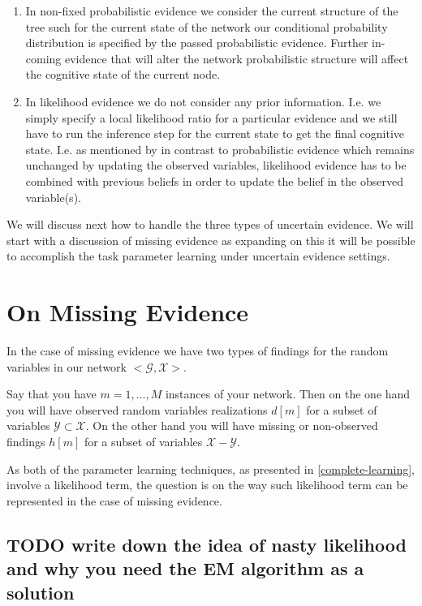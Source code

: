 \documentclass[11pt]{article}
\begin{document}
\begin{article}
\begin{enumerate}
\item In non-fixed probabilistic evidence we consider the current
structure of the tree such for the current state of the network
our conditional probability distribution is specified by the
passed probabilistic evidence. Further in-coming evidence that
will alter the network probabilistic structure will affect the
cognitive state of the current node.

\item In likelihood evidence we do not consider any prior
information. I.e. we simply specify a local likelihood ratio for
a particular evidence and we still have to run the inference step
for the current state to get the final cognitive state. I.e. as
mentioned by \cite{Mrad_2015} in contrast to probabilistic evidence
which remains unchanged by updating the observed variables,
likelihood evidence has to be combined with previous beliefs in
order to update the belief in the observed variable(s).
\end{enumerate}

We will discuss next how to handle the three types of uncertain
evidence. We will start with a discussion of missing evidence as
expanding on this it will be possible to accomplish the task
parameter learning under uncertain evidence settings.


\section{On Missing Evidence}
\label{sec:org35067d1}

In the case of missing evidence we have two types of findings for
the random variables in our network \(<\mathscr{G}, \mathscr{X}>\).

Say that you have \(m = 1, ..., M\) instances of your network. Then on
the one hand you will have observed random variables realizations
\(d[m]\) for a subset of variables \(\mathscr{Y} \subset
  \mathscr{X}\). On the other hand you will have missing or
non-observed findings \(h[m]\) for a subset of variables
\(\mathscr{X} - \mathscr{Y}\).

As both of the parameter learning techniques, as presented in
\ref{complete-learning}, involve a likelihood term, the question is on
the way such likelihood term can be represented in the case of
missing evidence.

\subsection{{\bfseries\sffamily TODO} write down the idea of nasty likelihood and why you need the EM algorithm as a solution}
\label{sec:org3e857c1}


\end{article}
\end{document}
